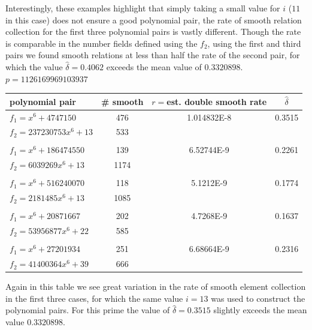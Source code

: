 \documentclass[a4paper, 10pt, envcountsect, runningheads]{lms}
\numberwithin{figure}{section}
\numberwithin{equation}{section}
\begin{document}
Interestingly, these examples highlight that simply taking a small value for $i$ ($11$ in this case) does not ensure a good polynomial pair, the rate of smooth relation collection for the first three polynomial pairs is vastly different. Though the rate is comparable in the number fields defined using the $f_2$, using the first and third pairs we found smooth relations at less than half the rate of the second pair, for which the value $\hat{\delta}=0.4062$ exceeds the mean value of $0.3320898$.\\


$p=1126169969103937$
\vspace{0.5cm}
\begin{center}
\begin{tabular}{l|ccc}
polynomial pair & \# smooth & $r=$est. double smooth rate & $\hat{\delta}$\\
\hline
$f_1=x^6+4747150$ &476&1.014832E-8&0.3515\\
$f_2=237230753x^6+13$ &533&&\\
&&&\\
$f_1=x^6+186474550$ &139&6.52744E-9&0.2261\\
$f_2=6039269x^6+13$ &1174&&\\
&&&\\
$f_1=x^6+516240070$ &118&5.1212E-9&0.1774\\
$f_2=2181485x^6+13$ &1085&&\\
&&&\\
$f_1=x^6+20871667$ &202&4.7268E-9&0.1637\\
$f_2=53956877x^6+22$ &585&&\\
&&&\\
$f_1=x^6+27201934$ &251&6.68664E-9&0.2316\\
$f_2=41400364x^6+39$ &666&&\\
\end{tabular}
\end{center}
\vspace{0.5cm}
Again in this table we see great variation in the rate of smooth element collection in the first three cases, for which the same value $i=13$ was used to construct the polynomial pairs. For this prime the value of $\hat{\delta}=0.3515$ slightly exceeds the mean value $0.3320898$.
\end{document}
